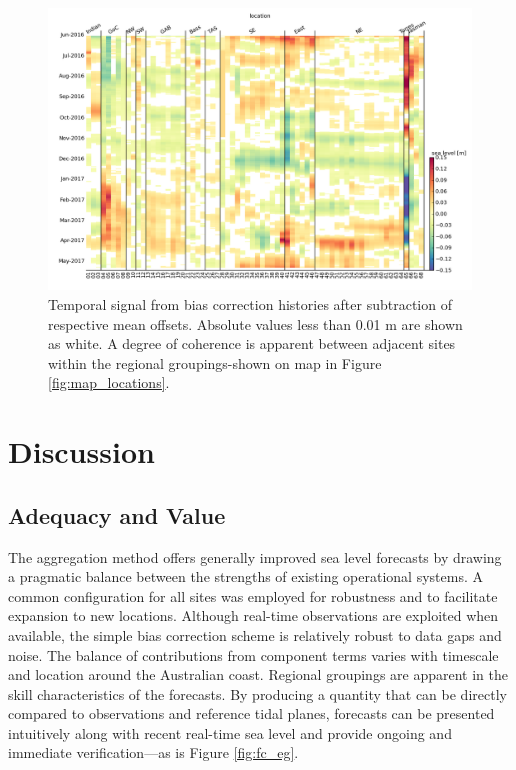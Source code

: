 \begin{figure}[H]
\centering
\includegraphics[width=1.0\textwidth]{figures/plots/aggSL_bias_breakdown_plot_2.png}
\caption{Temporal signal from bias correction histories after subtraction of respective mean offsets.  Absolute values less than 0.01 m are shown as white.  A degree of coherence is apparent between adjacent sites within the regional groupings-shown on map in Figure \ref{fig:map_locations}. } 
\label{fig:bias_time}
\end{figure}  


\section{Discussion}
\vspace{-6pt}
\subsection{Adequacy and Value}
The aggregation method offers generally improved sea level forecasts by drawing a pragmatic balance between the strengths of existing operational systems.
A common configuration for all sites was employed for robustness and to facilitate expansion to new locations.  
Although real-time observations are exploited when available, the simple bias correction scheme is relatively robust to data gaps and noise. 
The balance of contributions from component terms varies with timescale and location around the Australian coast.
Regional groupings are apparent in the skill characteristics of the forecasts.
By producing a quantity that can be directly compared to observations and reference tidal planes, forecasts can be presented intuitively along with recent real-time sea level and provide ongoing and immediate verification---as is Figure \ref{fig:fc_eg}.

